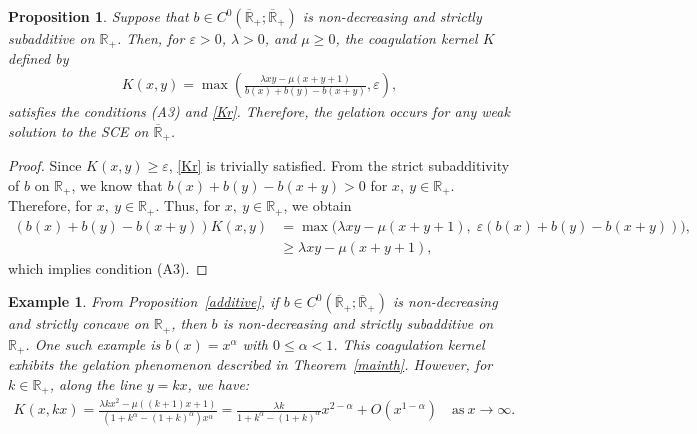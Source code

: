 \documentclass[a4paper,11pt]{article}
\newtheorem{prop}[thm]{Proposition}
\newtheorem{ex}[thm]{Example}
\def\Rp{{\mathbb R}_+}
\def\Rb{\overline{{\mathbb R}}_+}
\def\vep{\varepsilon}
\begin{document}
\begin{prop}\label{prop-gel}
Suppose that $b\in C^0(\Rb; \Rb)$ is non-decreasing
and strictly subadditive on $\Rp$. Then, for $\vep >0$, $\lambda >0$, and $\mu\ge 0$, the coagulation kernel $K$ defined by
\begin{align*}
K(x,y)=\max\left(\frac{\lambda xy-\mu (x+y+1)}{b(x)+b(y)-b(x+y)},\varepsilon\right),
\end{align*}
satisfies the conditions (A3) and \eqref{Kr}. Therefore, the gelation occurs for any weak solution to the SCE on $\Rb$.
\end{prop}
\begin{proof}
Since $K(x,y)\ge \vep$, \eqref{Kr} is trivially satisfied.
From the strict subadditivity of $b$ on $\Rp$, we know that
$b(x)+b(y)-b(x+y)>0$ for $x,~y\in \Rp$.
Therefore, for $x,~y\in \Rp$. Thus, for $x,~y\in \Rp$, we obtain
\begin{align*}
(b(x)+b(y)-b(x+y))K(x,y)
&=\max\big(
\lambda xy-\mu (x+y+1),\;
\varepsilon (b(x)+b(y)-b(x+y))\big),\\
&\ge \lambda xy-\mu (x+y+1),
\end{align*}
which implies condition (A3). 
\end{proof}

\begin{ex}\label{ex1}
{\rm From Proposition~\ref{additive}, if $b\in C^0(\Rb; \Rb)$ is non-decreasing and strictly concave on $\Rp$, then 
$b$ is non-decreasing
and strictly subadditive on $\Rp$.
One such example is $b(x)=x^\alpha$ with $0\leq\alpha<1$. 
This coagulation kernel exhibits the gelation phenomenon described in Theorem~\ref{mainth}. However, for $k\in\Rp$,
along the line $y=kx$, 
we have:
\begin{align*}
K(x,kx)=\frac{\lambda kx^2-\mu ((k+1)x+1)}
{(1+k^\alpha -(1+k)^\alpha)x^\alpha}=
\frac{\lambda k}
{1+k^\alpha -(1+k)^\alpha}x^{2-\alpha}+
O(x^{1-\alpha})\quad\text{as}~x\to\infty.
\end{align*}
}
\end{ex}
\end{document}
